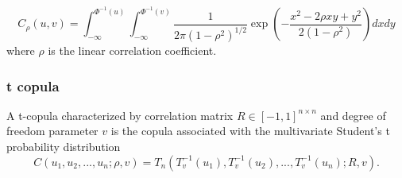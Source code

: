\begin{refsection}
\begin{example}
\end{example}


\begin{example}
	$$C_{\rho}(u,v) = \int_{-\infty}^{\Phi^{-1}(u)}\int_{-\infty}^{\Phi^{-1}(v)}\frac{1}{2\pi(1-\rho^2)^{1/2}}\exp(-\frac{x^2-2\rho x y + y^2}{2(1-\rho^2)}) dxdy$$
	where $\rho$ is the linear correlation coefficient.
\end{example}



\subsubsection{t copula}

\begin{definition}[t copula]\label{ch:statistical-models:def:tCopula}\cite[419]{roncalli2016lecture}
A t-copula 	characterized by correlation matrix $R\in [-1,1]^{n\times n}$ and degree of freedom parameter $v$ is the copula associated with the multivariate Student's t probability distribution
$$C(u_1,u_2,...,u_n;\rho,v) = T_n(T_v^{-1}(u_1),T_v^{-1}(u_2),...,T_v^{-1}(u_n);R,v).$$


\end{definition}



\end{refsection}
